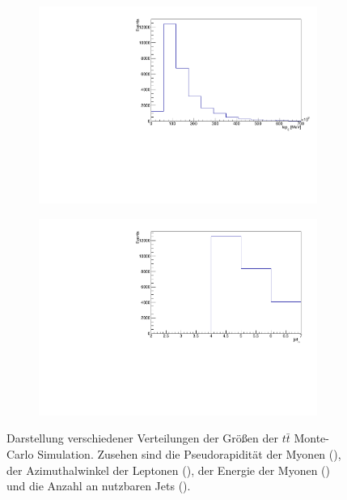 \begin{figure}[h]
\begin{subfigure}{0.5\textwidth}
    \includegraphics[width=\linewidth]{plots_and_txt/ttbar.mu_selected_/ttbar.mu_selected_lep_E.pdf}
    \caption{}
    \label{fig:jet_pt_good2}
  \end{subfigure}%
  \begin{subfigure}{0.5\textwidth}
    \centering
    \includegraphics[width=\linewidth]{plots_and_txt/ttbar.mu_selected_/ttbar.mu_selected_jet_n.pdf}
    \caption{}
    \label{fig:met_et2}
  \end{subfigure}%
  \caption{Darstellung verschiedener Verteilungen der Größen der $t\bar{t}$ Monte-Carlo Simulation.
  Zusehen sind die Pseudorapidität der Myonen (), der Azimuthalwinkel der Leptonen (), der Energie der Myonen () und die Anzahl an nutzbaren Jets ().
  }
  \label{fig:Distributions2}
\end{figure}


